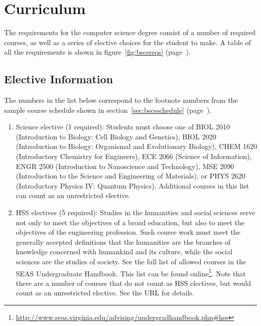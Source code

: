 \documentclass[10pt,letter,twocolumn]{book}
\newcommand{\mysection}[1]{\section{#1}\renewcommand{\rightmark}{#1}}
\newcommand{\myurl}[1]{\footnote{\scriptsize\url{#1}}}
\begin{document}
\mysection{Curriculum}

The requirements for the computer science degree consist of a number
of required courses, as well as a series of elective choices for the
student to make.  A table of all the requirements is shown in
figure~\ref{fig:bscsreqs} (page~\pageref{fig:bscsreqs}).

\subsection{Elective Information}
\label{sec:electiveinfo}

The numbers in the list below correspond to the footnote numbers from
the sample course schedule shown in section~\ref{sec:bscsschedule}
(page~\pageref{sec:bscsschedule}).

\begin{enumerate}

\item Science elective (1 required): Students must choose one of BIOL
  2010 (Introduction to Biology: Cell Biology and Genetics),
  BIOL 2020 (Introduction to Biology: Organismal and
  Evolutionary Biology), CHEM 1620 (Introductory Chemistry for
  Engineers), ECE 2066 (Science of Information), ENGR 2500
  (Introduction to Nano\-science and Technology), MSE 2090
  (Introduction to the Science and Engineering of Materials), or PHYS
  2620 (Introductory Physics IV: Quantum Physics). Additional
  courses in this list can count as an unrestricted elective.

\item HSS electives (5 required): Studies in the humanities and social
  sciences serve not only to meet the objectives of a broad education,
  but also to meet the objectives of the engineering profession. Such
  course work must meet the generally accepted definitions that the
  humanities are the branches of knowledge concerned with humankind
  and its culture, while the social sciences are the studies of
  society. See the full list of allowed courses in the SEAS
  Undergraduate Handbook. This list can be found
  online\myurl{http://www.seas.virginia.edu/advising/undergradhandbook.php\#hss}. Note
  that there are a number of courses that do not count as HSS
  electives, but would count as an unrestricted elective. See the URL
  for details.


\end{enumerate}
\end{document}
